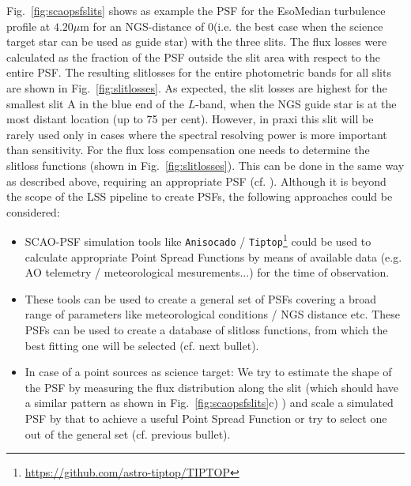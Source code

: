 Fig.~\ref{fig:scaopsfslits} shows as example the \ac{PSF} for the EsoMedian turbulence profile at $4.20\mu$m for an \ac{NGS}-distance of 0\arcsec  (i.e. the best case when the science target star can be used as guide star) with the three slits. The flux losses were calculated as the fraction of the \ac{PSF} outside the slit area with respect to the entire \ac{PSF}. The resulting slitlosses for the entire photometric bands for all slits are shown in Fig.~\ref{fig:slitlosses}. As expected, the slit losses are highest for the smallest slit A in the blue end of the $L$-band, when the \ac{NGS} guide star is at the most distant location (up to 75 per cent). However, in praxi this slit will be rarely used only in cases where the spectral resolving power is more important than sensitivity. %
For the flux loss compensation one needs to determine the slitloss functions (shown in Fig.~\ref{fig:slitlosses}). This can be done in the same way as described above, requiring an appropriate \ac{PSF} (cf. ). Although it is beyond the scope of the \ac{LSS} pipeline to create \ac{PSF}s, the following approaches could be considered:
\begin{itemize}
    \item \ac{SCAO}-\ac{PSF} simulation tools like \texttt{Anisocado} / \texttt{Tiptop}\footnote{\url{https://github.com/astro-tiptop/TIPTOP}} could be used to calculate appropriate Point Spread Functions by means of available data (e.g. \ac{AO} telemetry / meteorological mesurements...) for the time of observation.
    \item These tools can be used to create a general set of \ac{PSF}s covering a broad range of parameters like meteorological conditions / \ac{NGS} distance etc. These \ac{PSF}s can be used to create a database of slitloss functions, from which the best fitting one will be selected (cf. next bullet).
    \item In case of a point sources as science target: We try to estimate the shape of the \ac{PSF} by measuring the flux distribution along the slit (which should have a similar pattern as shown in Fig.~\ref{fig:scaopsfslits}c) ) and scale a simulated \ac{PSF} by that to achieve a useful Point Spread Function or try to select one out of the general set (cf. previous bullet).
\end{itemize}
